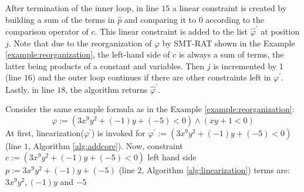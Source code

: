 \noindent After termination of the inner loop, in line $15$ a linear constraint is created by building a sum of the terms in $\hat{p}$ and comparing it to $0$ according to the comparison operator of $c$.
This linear constraint is added to the list $\hat{\varphi}^\prime$ at position $j$.
Note that due to the reorganization of $\varphi$ by SMT-RAT shown in the Example \ref{example:reorganization}, the left-hand side of $c$ is always a sum of terms, the latter being products of a constant and variables.
Then $j$ is incremented by 1 (line $16$) and the outer loop continues if there are other constraints left in $\varphi^\prime$.
Lastly, in line $18$, the algorithm returns $\hat{\varphi}^\prime$.\newline

\begin{example}
\label{example:linearization}
Consider the same example formula as in the Example \ref{example:reorganization}:
$$\varphi := (3x^9y^2 + (-1)y + (-5) < 0) \wedge (xy + 1 < 0)$$
At first, linearization($\varphi^\prime$) is invoked for $\varphi^\prime := (3x^9y^2 + (-1)y + (-5) < 0)$ (line $1$, Algorithm \ref{alg:addcore}).\newline
Now,\newline 
constraint $c := (3x^9y^2 + (-1)y + (-5) < 0)$\newline
left hand side $p := 3x^9y^2 + (-1)y + (-5)$ (line $2$, Algorithm \ref{alg:linearization})\newline
terms are: $3x^9y^2, (-1)y$ and $-5$\newline


\end{example}
